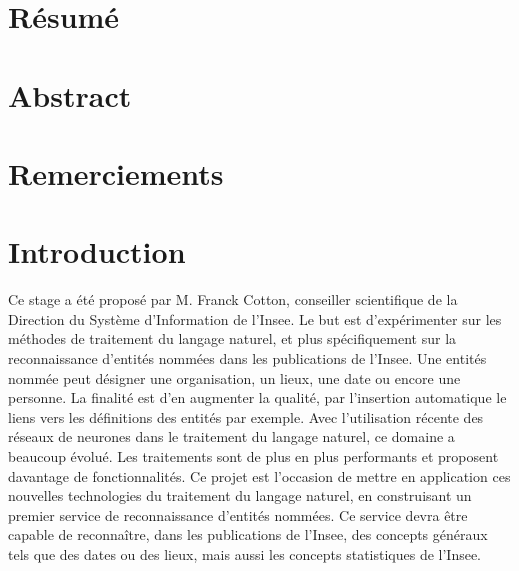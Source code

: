 \documentclass[11pt, oneside, a4paper, titlepage, french]{article}
\begin{document}

\begin{titlepage}

\end{titlepage}

\thispagestyle{empty}
\newpage

\section*{Résumé}
\newpage

\section*{Abstract}
\newpage

\section*{Remerciements}
\newpage

\tableofcontents
\newpage


\section*{Introduction}
Ce stage a été proposé par M. Franck Cotton, conseiller scientifique de la Direction du Système d'Information de l'Insee. Le but est d'expérimenter sur les méthodes de traitement du langage naturel, et plus spécifiquement sur la reconnaissance d'entités nommées dans les publications de l'Insee. Une entités nommée peut désigner une organisation, un lieux, une date ou encore une personne. La finalité est d'en augmenter la qualité, par l'insertion automatique le liens vers les définitions des entités par exemple. Avec l'utilisation récente des réseaux de neurones dans le traitement du langage naturel, ce domaine a beaucoup évolué. Les traitements sont de plus en plus performants et proposent davantage de fonctionnalités. Ce projet est l'occasion de mettre en application ces nouvelles technologies du traitement du langage naturel, en construisant un premier service de reconnaissance d'entités nommées. Ce service devra être capable de reconnaître, dans les publications de l'Insee, des concepts généraux tels que des dates ou des lieux, mais aussi les concepts statistiques de l'Insee.
\newline
\end{document}
